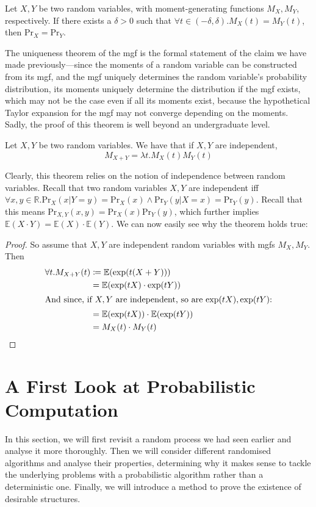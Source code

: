 		\begin{theorem}[Uniqueness]
			Let $X, Y$ be two random variables, with moment-generating functions $M_X, M_Y$, respectively. If there exists a 
			$\delta > 0$ such that $\forall t \in (-\delta, \delta). M_X(t) = M_Y(t)$, then $\mathrm{Pr}_X = \mathrm{Pr}_Y$.
		\end{theorem}
		The uniqueness theorem of the mgf is the formal statement of the claim we have made previously---since the moments of a random 
		variable can be constructed from its mgf, and the mgf uniquely determines the random variable's probability 
		distribution, its moments uniquely determine the distribution if the mgf exists, which may not be the case even if all its moments 
		exist, because the hypothetical Taylor expansion for the mgf may not converge depending on the moments. 
		Sadly, the proof of this theorem is well beyond an undergraduate level. 
		
		\begin{theorem}
			\label{theorem:summgf}
			Let $X, Y$ be two random variables. We have that if $X, Y$ are independent,
			$$
				M_{X+Y} = \lambda t. M_X(t) M_Y(t)
			$$
		\end{theorem}
		Clearly, this theorem relies on the notion of independence between random variables. Recall that two random variables $X,Y$ are 
		independent iff $\forall x, y \in \mathbb{R}. \mathrm{Pr}_X(x | Y = y) = \mathrm{Pr}_X(x) \land \mathrm{Pr}_Y(y | X = x) = 
		\mathrm{Pr}_Y(y)$. Recall that this means $\mathrm{Pr}_{X,Y}(x,y) = \mathrm{Pr}_X(x)\mathrm{Pr}_Y(y)$, which further implies
		$\mathbb{E}(X \cdot Y) = \mathbb{E}(X) \cdot \mathbb{E}(Y)$. We can now easily see why the theorem holds true:
		\begin{proof}
			So assume that $X,Y$ are independent random variables with mgfs $M_X, M_Y$. Then
			\begin{align*}
				\forall t . M_{X+Y}(t) &\coloneqq \mathbb{E}(\exp(t(X+Y))) \\
				                       &= \mathbb{E}(\exp(tX)\cdot\exp(tY)) \\
						       \intertext{And since, if $X,Y$ are independent, so are $\exp(tX), \exp(tY)$:} 
						       &= \mathbb{E}(\exp(tX))\cdot \mathbb{E}(\exp(tY)) \\ 
						       &= M_X(t) \cdot M_Y(t)
			\end{align*}
		\end{proof}
	
	\section{A First Look at Probabilistic Computation}
		In this section, we will first revisit a random process we had seen earlier and analyse it more thoroughly. Then we will consider 
		different randomised algorithms and analyse their properties, determining why it makes sense to tackle the underlying problems
		with a probabilistic algorithm rather than a deterministic one. Finally, we will introduce a method to prove the existence of 
		desirable structures.
	
